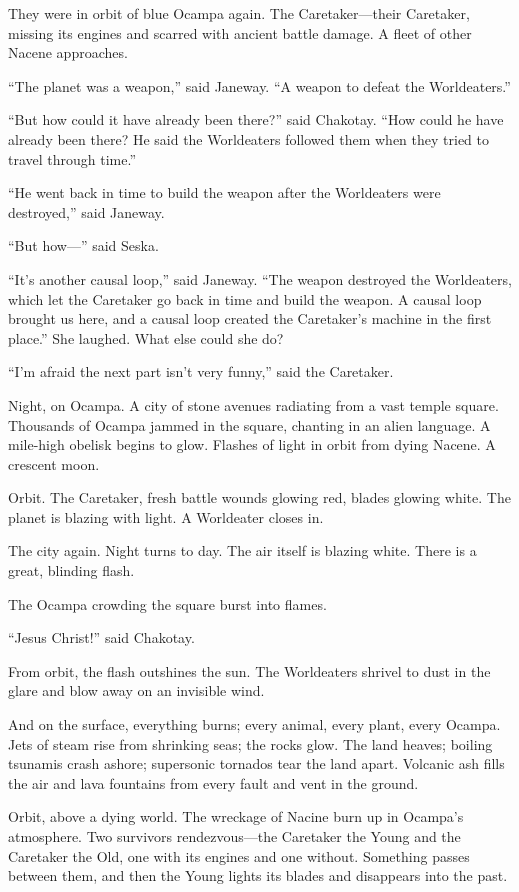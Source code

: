\documentclass[twoside,letterpaper,12pt]{memoir}
\begin{document}
They were in orbit of blue Ocampa again. The Caretaker—their Caretaker, missing its engines and scarred with ancient battle damage. A fleet of other Nacene approaches. 

``The planet was a weapon,” said Janeway. ``A weapon to defeat the Worldeaters.” 

``But how could it have already been there?” said Chakotay. ``How could he have already been there? He said the Worldeaters followed them when they tried to travel through time.” 

``He went back in time to build the weapon after the Worldeaters were destroyed,” said Janeway. 

``But how—” said Seska. 

``It’s another causal loop,” said Janeway. ``The weapon destroyed the Worldeaters, which let the Caretaker go back in time and build the weapon. A causal loop brought us here, and a causal loop created the Caretaker’s machine in the first place.” She laughed. What else could she do? 

``I’m afraid the next part isn’t very funny,” said the Caretaker. 

Night, on Ocampa. A city of stone avenues radiating from a vast temple square. Thousands of Ocampa jammed in the square, chanting in an alien language. A mile-high obelisk begins to glow. Flashes of light in orbit from dying Nacene. A crescent moon. 

Orbit. The Caretaker, fresh battle wounds glowing red, blades glowing white. The planet is blazing with light. A Worldeater closes in. 

The city again. Night turns to day. The air itself is blazing white. There is a great, blinding flash. 

The Ocampa crowding the square burst into flames. 

``Jesus Christ!” said Chakotay. 

From orbit, the flash outshines the sun. The Worldeaters shrivel to dust in the glare and blow away on an invisible wind. 

And on the surface, everything burns; every animal, every plant, every Ocampa. Jets of steam rise from shrinking seas; the rocks glow. The land heaves; boiling tsunamis crash ashore; supersonic tornados tear the land apart. Volcanic ash fills the air and lava fountains from every fault and vent in the ground. 

Orbit, above a dying world. The wreckage of Nacine burn up in Ocampa’s atmosphere. Two survivors rendezvous—the Caretaker the Young and the Caretaker the Old, one with its engines and one without. Something passes between them, and then the Young lights its blades and disappears into the past. 
\end{document}
